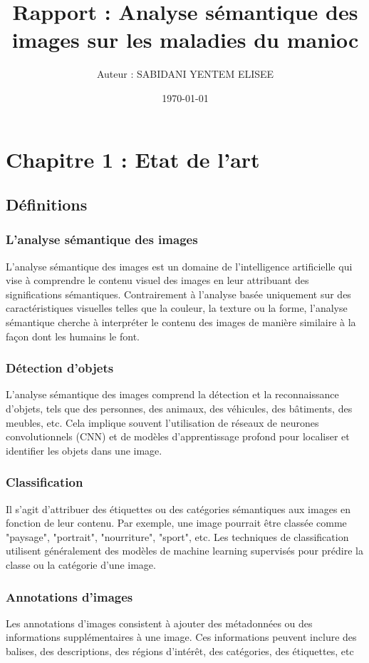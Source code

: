 \documentclass{article}
\author{Auteur : SABIDANI YENTEM ELISEE}
\title{Rapport : Analyse sémantique des images sur les maladies du manioc}
\date{\today}
\begin{document}
	
	\maketitle
	
	\newpage
	\tableofcontents
	\newpage
	

	\section{Chapitre 1 : Etat de l'art}
	\subsection{Définitions}
	\subsubsection{L'analyse sémantique des images}
	\quad L'analyse sémantique des images est un domaine de l'intelligence artificielle qui vise à comprendre le contenu visuel des images en leur attribuant des significations sémantiques. Contrairement à l'analyse basée uniquement sur des caractéristiques visuelles telles que la couleur, la texture ou la forme, l'analyse sémantique cherche à interpréter le contenu des images de manière similaire à la façon dont les humains le font.
	
	\subsubsection{Détection d'objets}
	\quad L'analyse sémantique des images comprend la détection et la reconnaissance d'objets, tels que des personnes, des animaux, des véhicules, des bâtiments, des meubles, etc. Cela implique souvent l'utilisation de réseaux de neurones convolutionnels (CNN) et de modèles d'apprentissage profond pour localiser et identifier les objets dans une image.
	
	\subsubsection{Classification}
	\quad Il s'agit d'attribuer des étiquettes ou des catégories sémantiques aux images en fonction de leur contenu. Par exemple, une image pourrait être classée comme "paysage", "portrait", "nourriture", "sport", etc. Les techniques de classification utilisent généralement des modèles de machine learning supervisés pour prédire la classe ou la catégorie d'une image.
	
	\subsubsection{Annotations d'images}
	 Les annotations d'images consistent à ajouter des métadonnées ou des informations supplémentaires à une image. Ces informations peuvent inclure des balises, des descriptions, des régions d'intérêt, des catégories, des étiquettes, etc
	 
\end{document}
